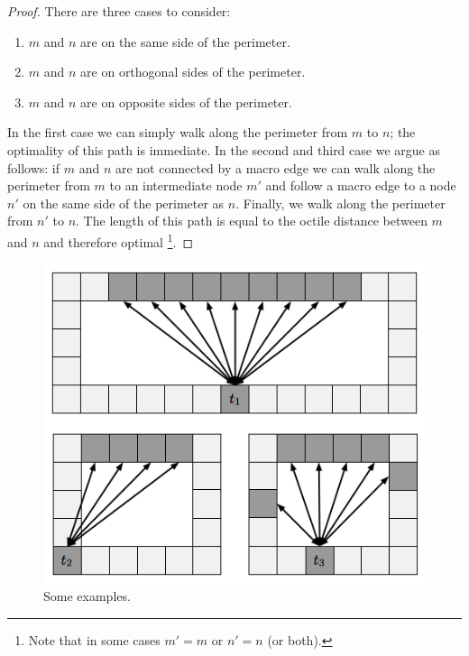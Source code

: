 \begin{proof}
There are three cases to consider:
\begin{enumerate}
\item{$m$ and $n$ are on the same side of the perimeter.}
\item{$m$ and $n$ are on orthogonal sides of the perimeter.}
\item{$m$ and $n$ are on opposite sides of the perimeter.}
\end{enumerate}
In the first case we can simply walk along the perimeter from $m$ to $n$; the optimality of this path is immediate. 
In the second and third case we argue as follows: if $m$ and $n$ are not connected by a macro edge
we can walk along the perimeter from $m$ to an intermediate node $m'$ and follow a macro edge to a node $n'$ on the 
same side of the perimeter as $n$. Finally, we walk along the perimeter from $n'$ to $n$.
The length of this path is equal to the octile distance between $m$ and $n$ and therefore optimal
\footnote{Note that in some cases $m' = m$ or $n' = n$ (or both).}.
\end{proof}


\begin{figure}[tb]
       \begin{center}
                       \includegraphics[scale=0.5, trim = 10mm 10mm 10mm 0mm]{diagrams/fan.png}
       \end{center}
	\vspace{-3pt}
       \caption{Some examples.}
       \label{fig-fan}
\end{figure}
